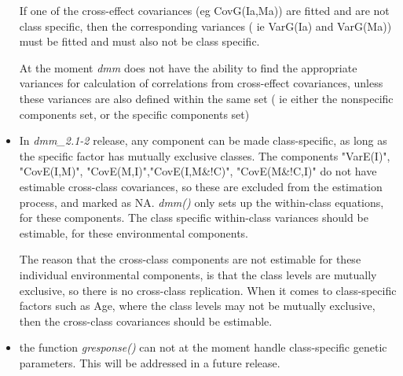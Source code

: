 \documentclass[titlepage]{article}  %
\begin{document}
\begin{itemize}
 If one of the cross-effect covariances (eg CovG(Ia,Ma)) are fitted and are not class specific, then the corresponding variances ( ie VarG(Ia) and VarG(Ma)) must be fitted and must also not be class specific.

 At the moment {\em dmm} does not have the ability to find the appropriate variances for calculation of correlations from cross-effect covariances, unless these variances are also defined within the same set ( ie either the nonspecific components set, or the specific components set)
\item In {\em dmm\_2.1-2} release, any component can be made class-specific, as long as the specific factor has mutually exclusive classes. The components "VarE(I)",  "CovE(I,M)", "CovE(M,I)","CovE(I,M\&!C)", "CovE(M\&!C,I)" do not have estimable cross-class covariances, so these are excluded from the estimation process, and marked as NA.  {\em dmm()} only sets up  the within-class equations, for these components. The class specific within-class variances should be estimable, for these environmental components.

   The reason that the cross-class components are not estimable for these individual environmental components, is that the class levels are mutually exclusive, so there is no cross-class replication. When it comes to class-specific factors such as Age, where the class levels may not be mutually exclusive, then the cross-class covariances should be estimable. 
\item the function {\em gresponse()} can not at the moment handle class-specific genetic parameters. This will be addressed in a future release.
\end{itemize}
 
\end{document}
